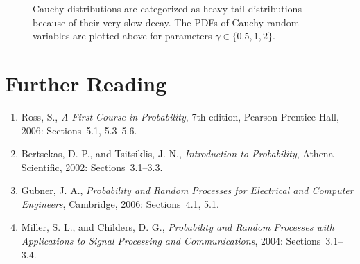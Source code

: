 \begin{figure}[ht]
\begin{center}
\end{center}
\caption{Cauchy distributions are categorized as heavy-tail distributions because of their very slow decay.
The PDFs of Cauchy random variables are plotted above for parameters $\gamma \in \{ 0.5, 1, 2 \}$.}
\end{figure}


\section*{Further Reading}

\begin{small}
\begin{enumerate}
\item Ross, S., \emph{A First Course in Probability}, 7th edition, Pearson Prentice Hall, 2006: Sections~5.1, 5.3--5.6.
\item Bertsekas, D. P., and Tsitsiklis, J. N., \emph{Introduction to Probability}, Athena Scientific, 2002: Sections~3.1--3.3.
\item Gubner, J. A., \emph{Probability and Random Processes for Electrical and Computer Engineers}, Cambridge, 2006: Sections~4.1, 5.1.
\item Miller, S. L., and Childers, D. G., \emph{Probability and Random Processes with Applications to Signal Processing and Communications}, 2004: Sections~3.1--3.4.
\end{enumerate}
\end{small}

